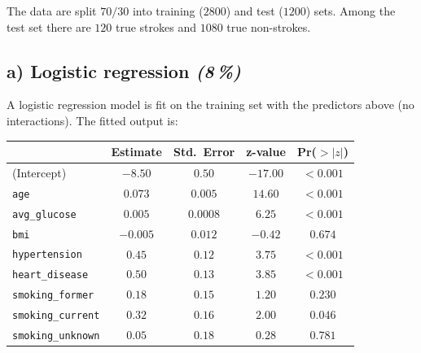 \documentclass[11pt,a4paper]{article}
\newcommand{\subpoints}[1]{\textit{(#1\,\%)}}
\begin{document}
The data are split $70/30$ into training ($2800$) and test ($1200$) sets. Among the test set there are $120$ true strokes and $1080$ true non-strokes.

\subsection*{a) Logistic regression \subpoints{8}}

A logistic regression model is fit on the training set with the predictors above (no interactions). The fitted output is:

\begin{center}\small
\begin{tabular}{lcccc}
\toprule
 & \textbf{Estimate} & \textbf{Std.\ Error} & \textbf{z-value} & \textbf{Pr($>|z|$)} \\
\midrule
(Intercept)            & $-8.50$   & $0.50$     & $-17.00$  & $<0.001$ \\
\texttt{age}           & $0.073$   & $0.005$    & $14.60$   & $<0.001$ \\
\texttt{avg\_glucose}  & $0.005$   & $0.0008$   & $6.25$    & $<0.001$ \\
\texttt{bmi}           & $-0.005$  & $0.012$    & $-0.42$   & $0.674$  \\
\texttt{hypertension}  & $0.45$    & $0.12$     & $3.75$    & $<0.001$ \\
\texttt{heart\_disease}& $0.50$    & $0.13$     & $3.85$    & $<0.001$ \\
\texttt{smoking\_former}  & $0.18$ & $0.15$     & $1.20$    & $0.230$  \\
\texttt{smoking\_current} & $0.32$ & $0.16$     & $2.00$    & $0.046$  \\
\texttt{smoking\_unknown} & $0.05$ & $0.18$     & $0.28$    & $0.781$  \\
\bottomrule
\end{tabular}
\end{center}
\end{document}
